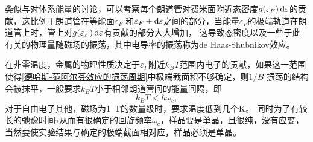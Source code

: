             类似与对体系能量的讨论，可以考察每个朗道管对费米面附近态密度$g(\varepsilon_F)\mathop{}\!\mathrm{d} \varepsilon$的贡献，这比例于朗道管在等能面$\varepsilon_F$
            和$\varepsilon_F+\mathop{}\!\mathrm{d} \varepsilon$之间的部分，当能量$\varepsilon_F$的极端轨道在朗道管上时，管上对$g(\varepsilon_F)\mathop{}\!\mathrm{d} \varepsilon$有贡献的部分大大增加，
            这导致态密度以及一些于此有关的物理量随磁场的振荡，其中电导率的振荡称为de Haas-Shubnikov效应。

            在非零温度，金属的物理性质决定于$\varepsilon_F$附近$k_BT$范围内电子的贡献，如果这一范围使得\autoref{德哈斯-范阿尔芬效应的振荡周期}中极端截面积不够确定，则$1/B$
            振荡的结构会被抹平，一般要求$k_BT$小于相邻朗道管间的能量间隔，即
            \begin{equation}
                k_BT<\hbar\omega_c,
            \end{equation}
            对于自由电子其他，磁场为\SI{1}{\tesla}的数量级时，要求温度低到几个\si{\K}。
            同时为了有较长的弛豫时间$\tau$从而有很确定的回旋频率$\omega_c$，样品要是单晶，且很纯，没有应变，当然要使实验结果与确定的极端截面相对应，样品必须是单晶。
